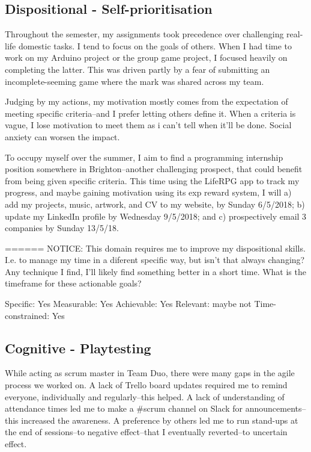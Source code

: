 \documentclass{scrartcl}
\begin{document}
\subsection{Dispositional - Self-prioritisation} %
Throughout the semester, my assignments took precedence over challenging real-life domestic tasks. I tend to focus on the goals of others. When I had time to work on my Arduino project or the group game project, I focused heavily on completing the latter. This was driven partly by a fear of submitting an incomplete-seeming game where the mark was shared across my team.

Judging by my actions, my motivation mostly comes from the expectation of meeting specific criteria--and I prefer letting others define it. When a criteria is vague, I lose motivation to meet them as i can't tell when it'll be done. Social anxiety can worsen the impact. 

To occupy myself over the summer, I aim to find a programming internship position somewhere in Brighton--another challenging prospect, that could benefit from being given specific criteria. This time using the LifeRPG app to track my progress, and maybe gaining motivation using its exp reward system, I will a) add my projects, music, artwork, and CV to my website, by Sunday 6/5/2018; b) update my LinkedIn profile by Wednesday 9/5/2018; and c) prospectively email 3 companies by Sunday 13/5/18.

======
NOTICE: This domain requires me to improve my dispositional skills. I.e. to manage my time in a diferent specific way, but isn't that always changing? Any technique I find, I'll likely find something better in a short time. What is the timeframe for these actionable goals?

Specific: Yes
Measurable: Yes
Achievable: Yes
Relevant: maybe not
Time-constrained: Yes

\subsection{Cognitive - Playtesting} %
While acting as scrum master in Team Duo, there were many gaps in the agile process we worked on. A lack of Trello board updates required me to remind everyone, individually and regularly--this helped. A lack of understanding of attendance times led me to make a \#scrum channel on Slack for announcements--this increased the awareness. A preference by others led me to run stand-ups at the end of sessions--to negative effect--that I eventually reverted--to uncertain effect.
\end{document}
